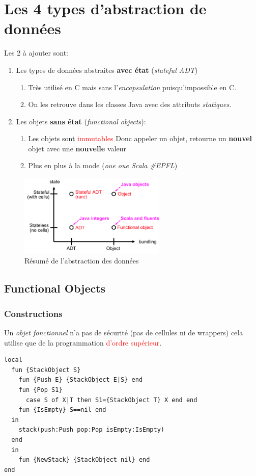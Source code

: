 \documentclass{report}
\begin{document}
\section{Les 4 types d'abstraction de données}

Les 2 à ajouter sont:
\begin{enumerate}
\item Les types de données abstraites \textbf{avec état} (\textit{stateful ADT})
	\begin{enumerate}
	\item Très utilisé en C mais sans l'\textit{encapsulation} puisqu'impossible en C.
	\item On les retrouve dans les classes Java avec des attributs \textit{statiques}.
	\end{enumerate}
\item Les objets \textbf{sans état} (\textit{functional objects}):
	\begin{enumerate}
	\item Les objets sont \textcolor{red}{immutables} Donc appeler un objet, retourne un \textbf{nouvel} objet avec une \textbf{nouvelle} valeur
	\item Plus en plus à la mode (\textit{oue oue Scala \#EPFL})
	\end{enumerate}
\end{enumerate}
\begin{figure}[H]
\centering
\includegraphics[width=7cm]{img/resAbstract.png}
\caption{Résumé de l'abstraction des données}
\end{figure}

\subsection{Functional Objects}
\subsubsection{Constructions}
Un \textit{objet fonctionnel} n'a pas de sécurité (pas de cellules ni de wrappers) cela utilise que de la programmation \textcolor{red}{d'ordre supérieur}.
\begin{lstlisting}[escapechar=\%]
local 
  fun {StackObject S} 
    fun {Push E} {StackObject E|S} end 
    fun {Pop S1} 
      case S of X|T then S1={StackObject T} X end end 
    fun {IsEmpty} S==nil end
  in
    stack(push:Push pop:Pop isEmpty:IsEmpty) 
  end 
  in 
    fun {NewStack} {StackObject nil} end
end
\end{lstlisting}
\end{document}
